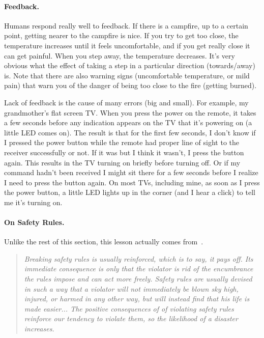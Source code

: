\paragraph{Feedback.}
Humans respond really well to feedback. If there is a campfire, up to a certain point, getting nearer to the campfire is nice. If you try to get too close, the temperature increases until it feels uncomfortable, and if you get really close it can get painful. When you step away, the temperature decreases. It's very obvious what the effect of taking a step in a particular direction (towards/away) is. Note that there are also warning signs (uncomfortable temperature, or mild pain) that warn you of the danger of being too close to the fire (getting burned).

Lack of feedback is the cause of many errors (big and small). For example, my grandmother's flat screen TV. When you press the power on the remote, it takes a few seconds before any indication appears on the TV that it's powering on (a little LED comes on). The result is that for the first few seconds, I don't know if I pressed the power button while the remote had proper line of sight to the receiver successfully or not. If it was but I think it wasn't, I press the button again. This results in the TV turning on briefly before turning off. Or if my command hadn't been received I might sit there for a few seconds before I realize I need to press the button again. On most TVs, including mine, as soon as I press the power button, a little LED lights up in the corner (and I hear a click) to tell me it's turning on.

\paragraph{On Safety Rules.}
Unlike the rest of this section, this lesson actually comes from~\cite{lofde, lof}.
\begin{quote}
\textit{Breaking safety rules is usually reinforced, which is to say, it pays off. Its immediate consequence is only that the violator is rid of the encumbrance the rules impose and can act more freely. Safety rules are usually devised in such a way that a violator will not immediately be blown sky high, injured, or harmed in any other way, but will instead find that his life is made easier... The positive consequences of of violating safety rules reinforce our tendency to violate them, so the likelihood of a disaster increases.}
\end{quote}


